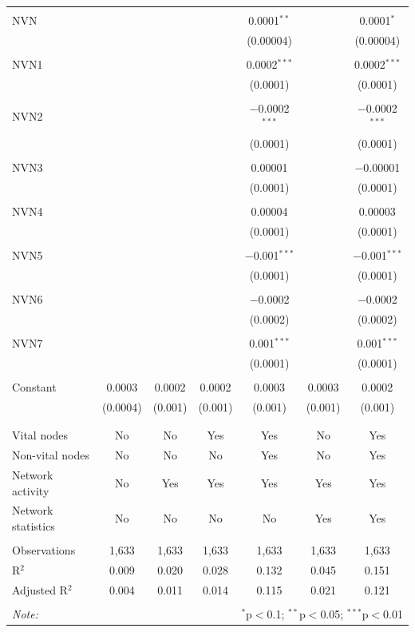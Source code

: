 \begin{table}[!htbp]
\begin{tabular}{@{\extracolsep{5pt}}lcccccc}
  & & & & & & \\ 
 NVN &  &  &  & 0.0001$^{**}$ &  & 0.0001$^{*}$ \\ 
  &  &  &  & (0.00004) &  & (0.00004) \\ 
  & & & & & & \\ 
 NVN1 &  &  &  & 0.0002$^{***}$ &  & 0.0002$^{***}$ \\ 
  &  &  &  & (0.0001) &  & (0.0001) \\ 
  & & & & & & \\ 
 NVN2 &  &  &  & $-$0.0002$^{***}$ &  & $-$0.0002$^{***}$ \\ 
  &  &  &  & (0.0001) &  & (0.0001) \\ 
  & & & & & & \\ 
 NVN3 &  &  &  & 0.00001 &  & $-$0.00001 \\ 
  &  &  &  & (0.0001) &  & (0.0001) \\ 
  & & & & & & \\ 
 NVN4 &  &  &  & 0.00004 &  & 0.00003 \\ 
  &  &  &  & (0.0001) &  & (0.0001) \\ 
  & & & & & & \\ 
 NVN5 &  &  &  & $-$0.001$^{***}$ &  & $-$0.001$^{***}$ \\ 
  &  &  &  & (0.0001) &  & (0.0001) \\ 
  & & & & & & \\ 
 NVN6 &  &  &  & $-$0.0002 &  & $-$0.0002 \\ 
  &  &  &  & (0.0002) &  & (0.0002) \\ 
  & & & & & & \\ 
 NVN7 &  &  &  & 0.001$^{***}$ &  & 0.001$^{***}$ \\ 
  &  &  &  & (0.0001) &  & (0.0001) \\ 
  & & & & & & \\ 
 Constant & 0.0003 & 0.0002 & 0.0002 & 0.0003 & 0.0003 & 0.0002 \\ 
  & (0.0004) & (0.001) & (0.001) & (0.001) & (0.001) & (0.001) \\ 
  & & & & & & \\ 
\hline \\[-1.8ex] 
Vital nodes & No & No & Yes & Yes & No & Yes \\ 
Non-vital nodes & No & No & No & Yes & No & Yes \\ 
Network activity & No & Yes & Yes & Yes & Yes & Yes \\ 
Network statistics & No & No & No & No & Yes & Yes \\ 
\hline &  &  &  &  &  &  \\ 
Observations & 1,633 & 1,633 & 1,633 & 1,633 & 1,633 & 1,633 \\ 
R$^{2}$ & 0.009 & 0.020 & 0.028 & 0.132 & 0.045 & 0.151 \\ 
Adjusted R$^{2}$ & 0.004 & 0.011 & 0.014 & 0.115 & 0.021 & 0.121 \\ 
\hline 
\hline \\[-1.8ex] 
\textit{Note:}  & \multicolumn{6}{r}{$^{*}$p$<$0.1; $^{**}$p$<$0.05; $^{***}$p$<$0.01} \\ 
\end{tabular} 
\end{table} 
